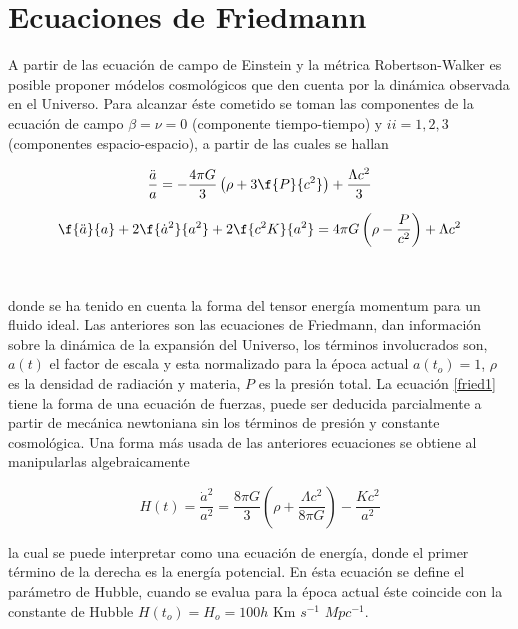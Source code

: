 \section{Ecuaciones de Friedmann}

A partir de las ecuación de campo de Einstein y la métrica Robertson-Walker 
es posible proponer módelos cosmológicos que den cuenta por la dinámica observada 
en el Universo. Para alcanzar éste cometido se toman las componentes 
de la ecuación de campo $\beta=\nu= 0$ (componente tiempo-tiempo) y 
$ii=1,2,3$ (componentes espacio-espacio),
a partir de las cuales se hallan

\begin{equation}
\frac{\ddot{a}}{a} = -\frac{4\pi G}{3 }\left( \rho + 3 \f{P}{c^2} \right)+\frac{\Lambda c^2}{3} 
\label{fried1}
\end{equation}

\[
\f{\ddot{a}}{a}+2\f{\dot{a}^2}{a^2}+2\f{c^2 K}{a^2} = 4\pi G\left( \rho-\frac{P}{c^2}\right)+\Lambda c^2
\]

\

donde se ha tenido en cuenta la forma del tensor energía momentum para 
un fluido ideal. Las anteriores son las ecuaciones de Friedmann, dan 
información sobre la dinámica de la expansión del Universo, los términos 
involucrados son,
$a(t)$ el factor de escala y esta normalizado para la época actual
$a(t_o)=1$, $\rho$ es la densidad de radiaci\'on y materia, $P$ es la 
presión total.   
La ecuación \ref{fried1} tiene la forma de una ecuación de fuerzas, 
puede ser deducida parcialmente a partir de mecánica newtoniana sin 
los términos de presión y constante cosmológica. 
Una forma más usada de las anteriores ecuaciones se obtiene al 
manipularlas algebraicamente

\begin{equation}
H(t)=\frac{\dot{a}^2}{a^2}=\frac{8 \pi G}{3}\left(\rho+\frac{\Lambda c^2}{8\pi G}\right) -\frac{Kc^2}{a^2}
\label{fried1}
\end{equation}


la cual se puede interpretar como una ecuación de energía, 
donde el primer término de la derecha es la energía potencial. 
En ésta ecuación se define el parámetro de Hubble, cuando se evalua para la época
actual éste coincide con la constante de Hubble $H(t_o)=H_o = 100h$ Km $s^{-1}$ $Mpc^{-1}$.


